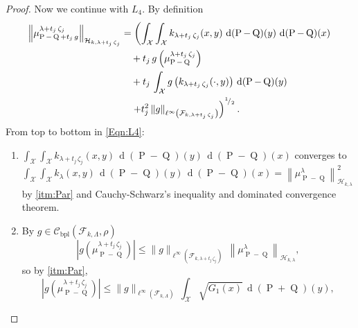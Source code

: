 \begin{proof}
				Now we continue with $L_{4}$. By definition
				\begin{equation}\label{Eqn:L4}
					\begin{aligned}
						\left\|\mu_{\operatorname{P}-\operatorname{Q}+t_{j}\,g}^{\lambda+t_{j}\,\zeta_{j}}\right\|_{\mathcal{H}_{k,\lambda+t_{j}\,\zeta_{j}}}&=\left(\int_{\mathcal{X}}\int_{\mathcal{X}}k_{\lambda+t_{j}\,\zeta_{j}}(x,y)\,\operatorname{d}(\operatorname{P}-\operatorname{Q})(y)\,\operatorname{d}(\operatorname{P}-\operatorname{Q})(x)\right.
						\\
						&\quad+t_{j}\,g\left(\mu_{\operatorname{P}-\operatorname{Q}}^{\lambda+t_{j}\,\zeta_{j}}\right)
						\\
						&\quad+t_{j}\,\int_{\mathcal{X}}g\left(k_{\lambda+t_{j}\,\zeta_{j}}(\cdot,y)\right)\,\operatorname{d}(\operatorname{P}-\operatorname{Q})(y)
						\\
						&\quad\left.+t_{j}^{2}\,\|g\|_{\ell^{\infty}\left(\mathcal{F}_{k,\lambda+t_{j}\,\zeta_{j}}\right)}\right)^{^{1}\!/_{2}}.
					\end{aligned}
				\end{equation}
				From top to bottom in \eqref{Eqn:L4}:
				\begin{enumerate}
					\item $\displaystyle\int_{\mathcal{X}}\int_{\mathcal{X}}k_{\lambda+t_{j}\,\zeta_{j}}(x,y)\,\operatorname{d}(\operatorname{P}-\operatorname{Q})(y)\,\operatorname{d}(\operatorname{P}-\operatorname{Q})(x)$ converges to\break$\displaystyle\int_{\mathcal{X}}\int_{\mathcal{X}}k_{\lambda}(x,y)\,\operatorname{d}(\operatorname{P}-\operatorname{Q})(y)\,\operatorname{d}(\operatorname{P}-\operatorname{Q})(x)=\left\|\mu_{\operatorname{P}-\operatorname{Q}}^{\lambda}\right\|_{\mathcal{H}_{k,\lambda}}^{2}$ by \ref{itm:Par} and Cauchy-Schwarz's inequality and dominated convergence theorem.
					\item By $g\in\mathcal{C}_{\operatorname{bpl}}\left(\mathcal{F}_{k,\Lambda},\rho\right)$
					\begin{equation}
						\left|g\left(\mu_{\operatorname{P}-\operatorname{Q}}^{\lambda+t_{j}\,\zeta_{j}}\right)\right|\leq\|g\|_{\ell^{\infty}\left(\mathcal{F}_{k,\lambda+t_{j}\,\zeta_{j}}\right)}\,\left\|\mu_{\operatorname{P}-\operatorname{Q}}^{\lambda}\right\|_{\mathcal{H}_{k,\lambda}},
					\end{equation}
					so by \ref{itm:Par},
					\begin{equation}
						\left|g\left(\mu_{\operatorname{P}-\operatorname{Q}}^{\lambda+t_{j}\,\zeta_{j}}\right)\right|\leq\|g\|_{\ell^{\infty}\left(\mathcal{F}_{k,\Lambda}\right)}\,\int_{\mathcal{X}}\sqrt{G_{1}(x)}\,\operatorname{d}(\operatorname{P}+\operatorname{Q})(y),

\end{equation}
\end{enumerate}
\end{proof}
